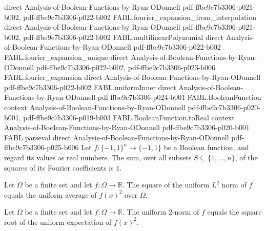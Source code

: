 \begin{theorem}
  {direct}
  {Analysis-of-Boolean-Functions-by-Ryan-ODonnell}
  {pdf-ffbe9c7b3306-p021-b002,
    pdf-ffbe9c7b3306-p022-b002}
\proofstep
  {FABL.fourier_expansion_from_interpolation}
  {direct}
  {Analysis-of-Boolean-Functions-by-Ryan-ODonnell}
  {pdf-ffbe9c7b3306-p021-b002,
    pdf-ffbe9c7b3306-p022-b002}
\proofstep
  {FABL.multilinearPolynomial}
  {direct}
  {Analysis-of-Boolean-Functions-by-Ryan-ODonnell}
  {pdf-ffbe9c7b3306-p022-b002}
\proofstep
  {FABL.fourier_expansion_unique}
  {direct}
  {Analysis-of-Boolean-Functions-by-Ryan-ODonnell}
  {pdf-ffbe9c7b3306-p022-b002,
    pdf-ffbe9c7b3306-p023-b006}
\proofstep
  {FABL.fourier_expansion}
  {direct}
  {Analysis-of-Boolean-Functions-by-Ryan-ODonnell}
  {pdf-ffbe9c7b3306-p022-b002}
\proofstep
  {FABL.uniformInner}
  {direct}
  {Analysis-of-Boolean-Functions-by-Ryan-ODonnell}
  {pdf-ffbe9c7b3306-p024-b001}
\proofstep
  {FABL.BooleanFunction}
  {context}
  {Analysis-of-Boolean-Functions-by-Ryan-ODonnell}
  {pdf-ffbe9c7b3306-p020-b001,
    pdf-ffbe9c7b3306-p019-b003}
\proofstep
  {FABL.BooleanFunction.toReal}
  {context}
  {Analysis-of-Boolean-Functions-by-Ryan-ODonnell}
  {pdf-ffbe9c7b3306-p020-b001}
\proofstep
  {FABL.parseval}
  {direct}
  {Analysis-of-Boolean-Functions-by-Ryan-ODonnell}
  {pdf-ffbe9c7b3306-p025-b006}
Let $f:\{-1,1\}^n\to\{-1,1\}$ be a Boolean function, and regard its values as real
numbers. The sum, over all subsets $S\subseteq\{1,\ldots,n\}$, of the squares of its
Fourier coefficients is $1$.
\end{theorem}

\begin{theorem}
\label{FABL.uniformLpNorm_two_sq_eq_expect_sq}
\leanok
{}
Let $\Omega$ be a finite set and let $f:\Omega\to\mathbb R$. The square of the uniform
$L^2$ norm of $f$ equals the uniform average of $f(x)^2$ over $\Omega$.
\end{theorem}

\begin{theorem}
\label{FABL.uniformLpNorm_two_eq_sqrt_expect_sq}
\leanok
{}
Let $\Omega$ be a finite set and let $f:\Omega\to\mathbb{R}$. The uniform $2$-norm of
$f$ equals the square root of the uniform expectation of $f(x)^2$.
\end{theorem}

